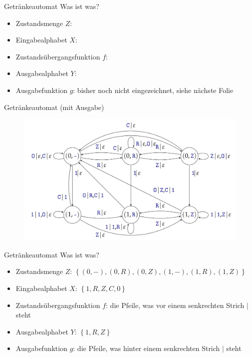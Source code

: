 \begin{frame}{Getränkeautomat}
    Was ist was?
    \begin{itemize}
        \item Zustandsmenge $Z$: 
            \pause
        \item Eingabealphabet $X$: 
            \pause
        \item Zustandsübergangsfunktion $f$: 
            \pause
        \item Ausgabealphabet $Y$: 
            \pause
        \item Ausgabefunktion $g$: bisher noch nicht eingezeichnet, siehe nächste Folie
            \pause
    \end{itemize}
\end{frame}
\begin{frame}{Getränkeautomat (mit Ausgabe)}
    \begin{figure}[htbp]
        \centering
        \includegraphics[width=\textwidth,height=\textheight,keepaspectratio]{graphics/10/getraenke2.png}
    \end{figure}
\end{frame}
\begin{frame}{Getränkeautomat}
    Was ist was?
    \begin{itemize}
        \item Zustandsmenge $Z$: $\left\{ \left( 0,- \right), \left( 0,R \right), \left( 0,Z \right), \left( 1,- \right), \left( 1,R \right), \left( 1,Z \right) \right\}$
        \item Eingabealphabet $X$: $\left\{ 1, R, Z, C, 0 \right\}$
        \item Zustandsübergangsfunktion $f$: die Pfeile, was vor einem senkrechten Strich $|$ steht
        \item Ausgabealphabet $Y$: $\left\{ 1, R, Z \right\}$
        \item Ausgabefunktion $g$: die Pfeile, was hinter einem senkrechten Strich $|$ steht
    \end{itemize}
\end{frame}
